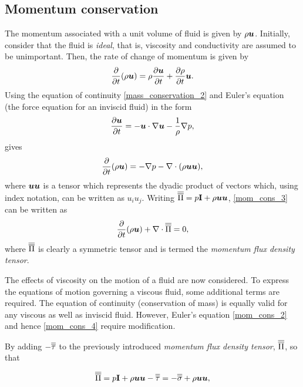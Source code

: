 \subsection{Momentum conservation}
The momentum associated with a unit volume of fluid is given by $\rho{\mbox{\boldmath$u$}}$. Initially, consider that the fluid is \textit{ideal}, that is, viscosity and conductivity are assumed to be unimportant. Then, the rate of change of momentum is given by
\begin{equation}\label{mom_cons_1}
 \frac{\partial}{\partial{t}}(\rho{\mbox{\boldmath$u$}})=\rho\frac{\partial{\mbox{\boldmath$u$}}}{\partial{t}}+\frac{\partial\rho}{\partial{t}}{\mbox{\boldmath$u$}}.
\end{equation}
Using the equation of continuity \eqref{mass_conservation_2} and Euler's
equation \citep{batchelor1967} (the force equation for an inviscid fluid) in the form
\begin{equation}\label{mom_cons_2}
 \frac{\partial{\mbox{\boldmath$u$}}}{\partial{t}}=-{\mbox{\boldmath$u$}}\cdot\nabla{\mbox{\boldmath$u$}}-\frac{1}{\rho}\nabla{p},
\end{equation}
gives
\begin{equation}\label{mom_cons_3}
 \frac{\partial}{\partial{t}}(\rho{\mbox{\boldmath$u$}})=-\nabla{p}-\nabla\cdot(\rho{\mbox{\boldmath$u$}}{\mbox{\boldmath$u$}}),
\end{equation}
where ${\mbox{\boldmath$u$}}{\mbox{\boldmath$u$}}$ is a tensor which represents the dyadic product of vectors which, using index notation, can be written as ${u_{i}u_{j}}$. Writing $\overline{\overline{\Pi}}=p\mathbf{I}+\rho{\mbox{\boldmath$u$}}{\mbox{\boldmath$u$}}$, \eqref{mom_cons_3} can be written as
\begin{equation}\label{mom_cons_4}
 \frac{\partial}{\partial{t}}(\rho{\mbox{\boldmath$u$}})+\nabla\cdot\overline{\overline{\Pi}}=0,
\end{equation}
where $\overline{\overline{\Pi}}$ is clearly a symmetric tensor and is termed the \textit{momentum flux density tensor}.

The effects of viscosity on the motion of a fluid are now considered. To express the equations of motion governing a viscous fluid, some additional terms are required. The equation of continuity (conservation of mass) is equally valid for any viscous as well as inviscid fluid. However, Euler's equation \eqref{mom_cons_2} and hence \eqref{mom_cons_4} require modification.

By adding $-\overline{\overline{\tau}}$ to the previously introduced \textit{momentum flux density tensor}, $\overline{\overline{\Pi}}$, so that

\begin{equation}
 \overline{\overline{\Pi}}=p\mathbf{I}+\rho{\mbox{\boldmath$u$}}{\mbox{\boldmath$u$}}-\overline{\overline{\tau}}=-\overline{\overline{\sigma}}+\rho{\mbox{\boldmath$u$}}{\mbox{\boldmath$u$}},
\end{equation}

